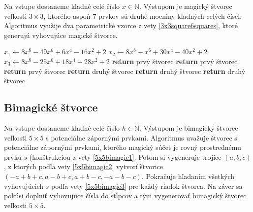 \begin{alg}
\label{algsquare3x3x}
Na vstupe dostaneme kladné celé číslo $x \in \mathbb{N}$. Výstupom je magický štvorec veľkosti $3 \times 3$, ktorého aspoň $7$ prvkov sú druhé mocniny kladných celých čísel. Algoritmus využije dva parametrické vzorce z vety \ref{3x3square6squares}, ktoré generujú vyhovujúce magické štvorce.
\end{alg}

\begin{algorithmic}
\STATE $x_1 \gets 8x^8 - 49x^6 + 6x^4 - 16x^2 + 2$
\STATE $x_2 \gets 8x^8 - x^6 + 30x^4 - 40x^2 + 2$
\STATE $x_3 \gets 8x^8 - 25x^6 + 18x^4 - 28x^2 + 2$
    \STATE \textbf{return} prvý štvorec
\ENDIF
{}
    \STATE \textbf{return} prvý štvorec
\ENDIF
{}
    \STATE \textbf{return} prvý štvorec
\ENDIF
{}
    \STATE \textbf{return} druhý štvorec
\ENDIF
{}
    \STATE \textbf{return} druhý štvorec
\ENDIF
{}
    \STATE \textbf{return} druhý štvorec
\ENDIF
\end{algorithmic}

\subsection{Bimagické štvorce}

\begin{alg}
\label{algsquare5x5b}
Na vstupe dostaneme kladné celé číslo $h \in \mathbb{N}$. Výstupom je bimagický štvorec veľkosti $5 \times 5$ s potenciálne zápornými prvkami. Algoritmus uvažuje štvorec s potenciálne zápornými prvkami, ktorého magický súčet je rovný prostrednému prvku $s$ (konštrukciou z vety \ref{5x5bimagic1}. Potom si vygeneruje trojice $(a,b,c)$, z ktorých podľa vety \ref{5x5bimagic2} vytvorí štvorice $(-a+b+c, a-b+c, a+b-c, -a-b-c)$. Pokračuje hľadaním všetkých vyhovujúcich $s$ podľa vety \ref{5x5bimagic3} pre každý riadok štvorca. Na záver sa pokúsi doplniť vyhovujúce čísla do stĺpcov a tým vygenerovať bimagický štvorec veľkosti $5 \times 5$.
\end{alg}

